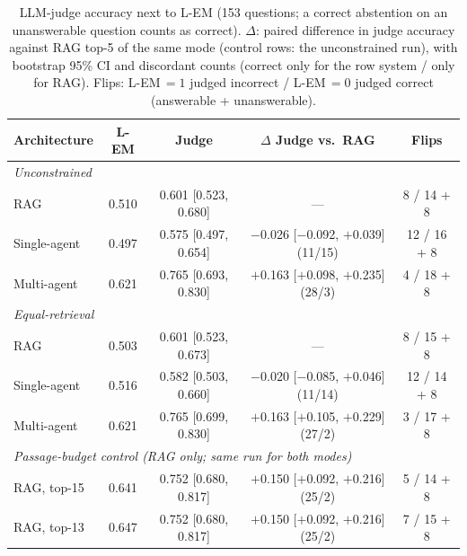 \documentclass[11pt,a4paper]{article}
\newcommand{\lem}{L-EM}
\begin{document}
\begin{table}[t]
\centering
\footnotesize
\setlength{\tabcolsep}{4pt}
\caption{LLM-judge accuracy next to \lem{} (153 questions; a correct
abstention on an unanswerable question counts as correct). $\Delta$: paired
difference in judge accuracy against RAG top-5 of the same mode (control rows:
the unconstrained run), with bootstrap 95\% CI and discordant counts
(correct only for the row system / only for RAG). Flips: \lem{}$\,=1$ judged
incorrect / \lem{}$\,=0$ judged correct (answerable + unanswerable).}
\label{tab:judge}
\begin{tabular}{lcccc}
\toprule
Architecture & \lem{} & Judge & $\Delta$ Judge vs.\ RAG & Flips \\
\midrule
\multicolumn{5}{l}{\emph{Unconstrained}} \\
\quad RAG & 0.510 & 0.601 {\scriptsize[0.523, 0.680]} & --- & 8 / 14 + 8 \\
\quad Single-agent & 0.497 & 0.575 {\scriptsize[0.497, 0.654]} & $-$0.026 {\scriptsize[$-$0.092, $+$0.039]} (11/15) & 12 / 16 + 8 \\
\quad Multi-agent & 0.621 & 0.765 {\scriptsize[0.693, 0.830]} & $+$0.163 {\scriptsize[$+$0.098, $+$0.235]} (28/3) & 4 / 18 + 8 \\
\midrule
\multicolumn{5}{l}{\emph{Equal-retrieval}} \\
\quad RAG & 0.503 & 0.601 {\scriptsize[0.523, 0.673]} & --- & 8 / 15 + 8 \\
\quad Single-agent & 0.516 & 0.582 {\scriptsize[0.503, 0.660]} & $-$0.020 {\scriptsize[$-$0.085, $+$0.046]} (11/14) & 12 / 14 + 8 \\
\quad Multi-agent & 0.621 & 0.765 {\scriptsize[0.699, 0.830]} & $+$0.163 {\scriptsize[$+$0.105, $+$0.229]} (27/2) & 3 / 17 + 8 \\
\midrule
\multicolumn{5}{l}{\emph{Passage-budget control (RAG only; same run for both modes)}} \\
\quad RAG, top-15 & 0.641 & 0.752 {\scriptsize[0.680, 0.817]} & $+$0.150 {\scriptsize[$+$0.092, $+$0.216]} (25/2) & 5 / 14 + 8 \\
\quad RAG, top-13 & 0.647 & 0.752 {\scriptsize[0.680, 0.817]} & $+$0.150 {\scriptsize[$+$0.092, $+$0.216]} (25/2) & 7 / 15 + 8 \\
\bottomrule
\end{tabular}
\end{table}
\end{document}
